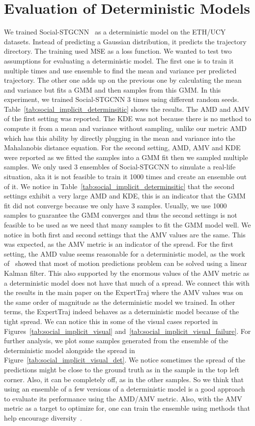\documentclass[runningheads]{llncs}
\begin{document}
\section{Evaluation of Deterministic Models}
We trained Social-STGCNN~\cite{mohamed2020social} as a deterministic model on the ETH/UCY datasets. Instead of predicting a Gaussian distribution, it predicts the trajectory directory. The training used MSE as a loss function. We wanted to test two assumptions for evaluating a deterministic model. The first one is to train it multiple times and use ensemble to find the mean and variance per predicted trajectory. The other one adds up on the previous one by calculating the mean and variance but fits a GMM and then samples from this GMM. In this experiment, we trained Social-STGCNN 3 times using different random seeds. Table~\ref{tab:social_implicit_determinsitic} shows the results. The AMD and AMV of the first setting was reported. The KDE was not because there is no method to compute it from a mean and variance without sampling, unlike our metric AMD which has this ability by directly plugging in the mean and variance into the Mahalanobis distance equation. For the second setting, AMD, AMV and KDE were reported as we fitted the samples into a GMM fit then we sampled multiple samples. We only used 3 ensembles of Social-STGCNN to simulate a real-life situation, aka it is not feasible to train it 1000 times and create an ensemble out of it. We notice in Table~\ref{tab:social_implicit_determinsitic} that the second settings exhibit a very large AMD and KDE, this is an indicator that the GMM fit did not converge because we only have 3 samples. Usually, we use 1000 samples to guarantee the GMM converges and thus the second settings is not feasible to be used as we need that many samples to fit the GMM model well. We notice in both first and second settings that the AMV values are the same. This was expected, as the AMV metric is an indicator of the spread. For the first setting, the AMD value seems reasonable for a deterministic model, as the work of~\cite{makansi2021exposing} showed that most of motion predictions problem can be solved using a linear Kalman filter. This also supported by the enormous values of the AMV metric as a deterministic model does not have that much of a spread. We connect this with the results in the main paper on the ExpertTraj where the AMV values was on the same order of magnitude as the deterministic model we trained. In other terms, the ExpertTraj indeed behaves as a deterministic model because of the tight spread. We can notice this in some of the visual cases reported in Figures~\ref{tab:social_implicit_visual} and~\ref{tab:social_implicit_visual_failure}. For further analysis, we plot some samples generated from the ensemble of the deterministic model alongside the spread in Figure~\ref{tab:social_implicit_visual_det}. We notice sometimes the spread of the predictions might be close to the ground truth as in the sample in the top left corner. Also, it can be completely off, as in the other samples. So we think that using an ensemble of a few versions of a deterministic model is a good approach to evaluate its performance using the AMD/AMV metric. Also, with the AMV metric as a target to optimize for, one can train the ensemble using methods that help encourage diversity~\cite{liu2019deep}.
\end{document}
